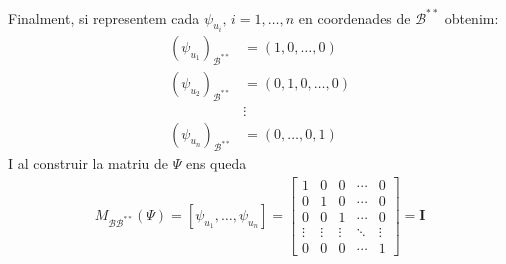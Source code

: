 \documentclass[a4paper, 11pt]{article}
\begin{document}
    Finalment, si representem cada $ \psi_{u_i} \text{, } i = 1,\dots,n $ en coordenades de $ \mathcal{B}^{**} $ obtenim:
    \begin{align*}
        (\psi_{u_1})_{\mathcal{B}^{**}} &= (1, 0, \dots, 0)\\
        (\psi_{u_2})_{\mathcal{B}^{**}} &= (0, 1, 0, \dots, 0)\\
        &\vdots\\
        (\psi_{u_n})_{\mathcal{B}^{**}} &= (0, \dots, 0, 1)
    \end{align*}
    I al construir la matriu de $ \Psi $ ens queda
    \begin{gather*}
        M_{\mathcal{B}\mathcal{B}^{**}}(\Psi) = \left[ \psi_{u_1}, \dots, \psi_{u_n} \right] =
        \begin{bmatrix}
            1 & 0 & 0 & \cdots & 0 \\
            0 & 1 & 0 & \cdots & 0 \\
            0 & 0 & 1 & \cdots & 0 \\
            \vdots & \vdots & \vdots & \ddots & \vdots \\
            0 & 0 & 0 & \cdots & 1
        \end{bmatrix}
        = \mathbf{I} 
    \end{gather*}
\end{document}
